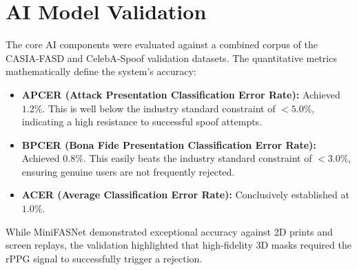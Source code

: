 \documentclass[12pt, a4paper]{report}
\begin{document}
\section{AI Model Validation}
The core AI components were evaluated against a combined corpus of the CASIA-FASD and CelebA-Spoof validation datasets. The quantitative metrics mathematically define the system's accuracy:
\begin{itemize}
    \item \textbf{APCER (Attack Presentation Classification Error Rate):} Achieved $1.2\%$. This is well below the industry standard constraint of $< 5.0\%$, indicating a high resistance to successful spoof attempts.
    \item \textbf{BPCER (Bona Fide Presentation Classification Error Rate):} Achieved $0.8\%$. This easily beats the industry standard constraint of $< 3.0\%$, ensuring genuine users are not frequently rejected.
    \item \textbf{ACER (Average Classification Error Rate):} Conclusively established at $1.0\%$.
\end{itemize}
While MiniFASNet demonstrated exceptional accuracy against 2D prints and screen replays, the validation highlighted that high-fidelity 3D masks required the rPPG signal to successfully trigger a rejection.
\end{document}
